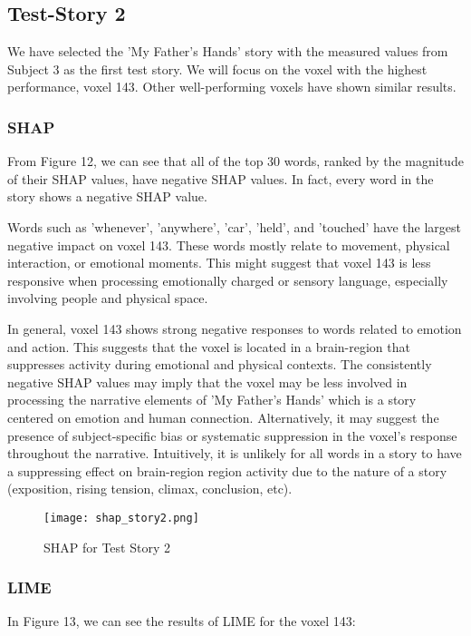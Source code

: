 \documentclass[12pt,letterpaper]{article}
\begin{document}
\subsection{Test-Story 2}
We have selected the 'My Father's Hands' story with the measured values from Subject 3 as the first test story. We will focus on the voxel with the highest performance, voxel 143. Other well-performing voxels have shown similar results.

\subsubsection{SHAP}

From Figure 12, we can see that all of the top 30 words, ranked by the magnitude of their SHAP values, have negative SHAP values. In fact, every word in the story shows a negative SHAP value.   

Words such as 'whenever', 'anywhere', 'car', 'held', and 'touched' have the largest negative impact on voxel 143. These words mostly relate to movement, physical interaction, or emotional moments.  
This might suggest that voxel 143 is less responsive when processing emotionally charged or sensory language, especially involving people and physical space.   

In general, voxel 143 shows strong negative responses to words related to emotion and action. This suggests that the voxel is located in a brain-region that suppresses activity during emotional and physical contexts. 
The consistently negative SHAP values may imply that the voxel may be less involved in processing the narrative elements of 'My Father's Hands' which is a story centered on emotion and human connection. Alternatively, it may suggest the presence of subject-specific bias or systematic suppression in the voxel's response throughout the narrative. Intuitively, it is unlikely for all words in a story to have a suppressing effect on brain-region region activity due to the nature of a story (exposition, rising tension, climax, conclusion, etc).   

\begin{figure}[H]
    \centering
    \texttt{[image: shap\_story2.png]}
    \caption{SHAP for Test Story 2}
    \label{fig:enter-label}
\end{figure}


\subsubsection{LIME}
In Figure 13, we can see the results of LIME for the voxel 143:
\end{document}
